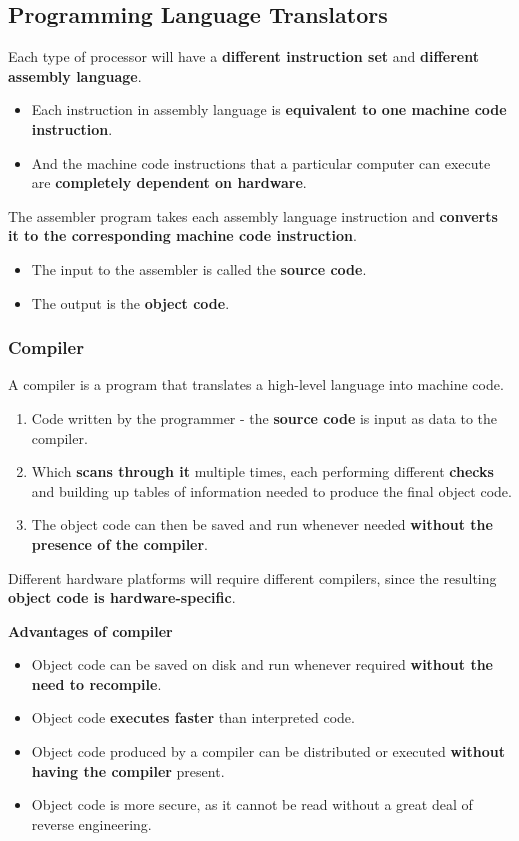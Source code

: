 \subsection{Programming Language Translators}

Each type of processor will have a \textbf{different instruction set} and \textbf{different assembly language}.
\begin{itemize}
    \item Each instruction in assembly language is \textbf{equivalent to one machine code instruction}.
    \item And the machine code instructions that a particular computer can execute are \textbf{completely dependent on hardware}.
\end{itemize}

The assembler program takes each assembly language instruction and \textbf{converts it to the corresponding machine code instruction}.
\begin{itemize}
    \item The input to the assembler is called the \textbf{source code}.
    \item The output is the \textbf{object code}.
\end{itemize}

\subsubsection*{Compiler}

A compiler is a program that translates a high-level language into machine code.
\begin{enumerate}
    \item Code written by the programmer - the \textbf{source code} is input as data to the compiler.
    \item Which \textbf{scans through it} multiple times, each performing different \textbf{checks} and building up tables of information needed to produce the final object code.
    \item The object code can then be saved and run whenever needed \textbf{without the presence of the compiler}.
\end{enumerate}

Different hardware platforms will require different compilers, since the resulting \textbf{object code is hardware-specific}.

\textbf{Advantages of compiler}
\begin{itemize}
    \item Object code can be saved on disk and run whenever required \textbf{without the need to recompile}.
    \item Object code \textbf{executes faster} than interpreted code.
    \item Object code produced by a compiler can be distributed or executed \textbf{without having the compiler} present.
    \item Object code is more secure, as it cannot be read without a great deal of reverse engineering.
\end{itemize}

